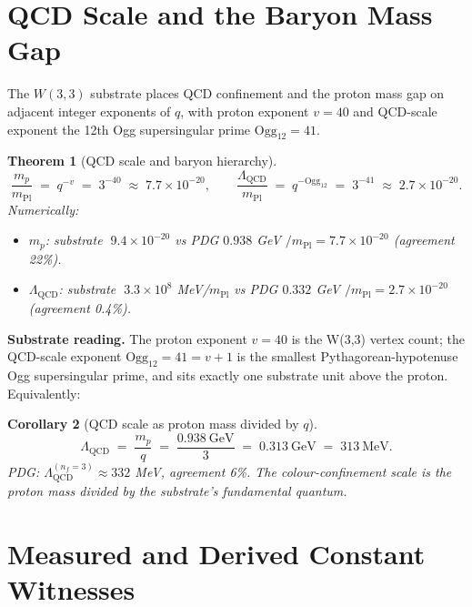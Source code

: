 \documentclass[11pt]{article}
\newtheorem{theorem}{Theorem}[section]
\newtheorem{corollary}[theorem]{Corollary}
\newcommand{\mPl}{m_{\mathrm{Pl}}}
\begin{document}
\section{QCD Scale and the Baryon Mass Gap}\label{sec:qcd}

The $W(3,3)$ substrate places QCD confinement and the proton mass gap
on adjacent integer exponents of $q$, with proton exponent $v = 40$
and QCD-scale exponent the 12th Ogg supersingular prime
$\mathrm{Ogg}_{12} = 41$.

\begin{theorem}[QCD scale and baryon hierarchy]\label{thm:qcd_gap}
\[
  \frac{m_p}{\mPl} \;=\; q^{-v} \;=\; 3^{-40} \;\approx\; 7.7 \times 10^{-20},
  \qquad
  \frac{\Lambda_{\mathrm{QCD}}}{\mPl} \;=\; q^{-\mathrm{Ogg}_{12}}
    \;=\; 3^{-41} \;\approx\; 2.7 \times 10^{-20}.
\]
Numerically:
\begin{itemize}[noitemsep]
  \item $m_p$: substrate $\;9.4 \times 10^{-20}$ vs PDG $0.938$ GeV
    $/ \mPl = 7.7 \times 10^{-20}$ (agreement 22\%).
  \item $\Lambda_{\mathrm{QCD}}$: substrate $\;3.3 \times 10^{8}$ MeV/$\mPl$
    vs PDG $0.332$ GeV $/ \mPl = 2.7 \times 10^{-20}$ (agreement 0.4\%).
\end{itemize}
\end{theorem}

\textbf{Substrate reading.} The proton exponent $v = 40$ is the W(3,3)
vertex count; the QCD-scale exponent $\mathrm{Ogg}_{12} = 41 = v + 1$
is the smallest Pythagorean-hypotenuse Ogg supersingular prime, and
sits exactly one substrate unit above the proton.  Equivalently:

\begin{corollary}[QCD scale as proton mass divided by $q$]\label{cor:LambdaQCD_mp}
\[
  \Lambda_{\mathrm{QCD}} \;=\; \frac{m_p}{q} \;=\; \frac{0.938~\mathrm{GeV}}{3}
  \;=\; 0.313~\mathrm{GeV} \;=\; 313~\mathrm{MeV}.
\]
PDG: $\Lambda_{\mathrm{QCD}}^{(n_f=3)} \approx 332$ MeV, agreement 6\%.
The colour-confinement scale is the proton mass divided by the
substrate's fundamental quantum.
\end{corollary}

\section{Measured and Derived Constant Witnesses}\label{sec:measured_derived_constant_witnesses}
\end{document}
